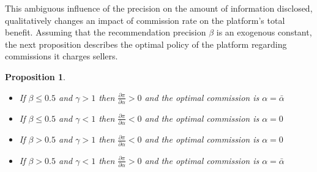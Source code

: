 \documentclass[a4paper]{article}
\newtheorem{proposition}[theorem]{Proposition}
\begin{document}
This ambiguous influence of the precision on the amount of information disclosed, qualitatively changes an impact of commission rate on the platform's total benefit. Assuming that the recommendation precision $\beta$ is an exogenous constant, the next proposition describes the optimal policy of the platform regarding commissions it charges sellers.




\begin{proposition}\label{profit_beta}
	\leavevmode 
	\begin{itemize}
		\item If $\beta \le 0.5$ and  $\gamma > 1$ then $\frac{\partial \pi }{\partial \alpha} > 0$ and the optimal commission is $\alpha = \bar{\alpha}$
		\item  If $\beta \le 0.5$ and $\gamma < 1$ then $\frac{\partial \pi }{\partial \alpha} < 0$ and the optimal commission is $\alpha = 0$	
		\item If $\beta > 0.5$ and  $\gamma > 1$ then $\frac{\partial \pi }{\partial \alpha} < 0$ and the optimal commission is $\alpha = 0$
		\item If $\beta > 0.5$ and $\gamma < 1$ then $\frac{\partial \pi }{\partial \alpha} > 0$ and the optimal commission is $\alpha = \bar{\alpha}$
	\end{itemize}
\end{proposition}
\end{document}
